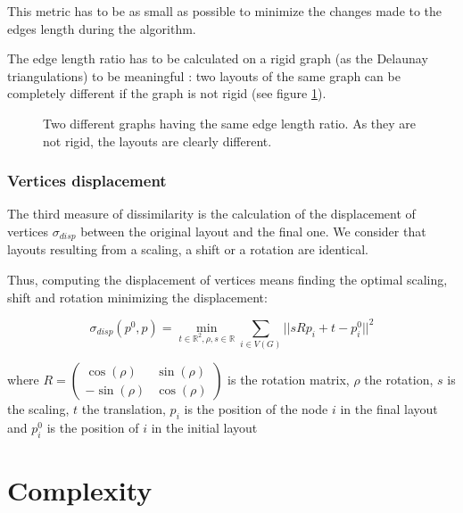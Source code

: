 \documentclass[12pt]{report}
\begin{document}
This metric has to be as small as possible to minimize the changes made to the edges length during the algorithm.

The edge length ratio has to be calculated on a rigid graph (as the Delaunay triangulations) to be meaningful : two layouts of the same graph can be completely different if the graph is not rigid (see figure \ref{rigidGraph}).

\begin{figure}[h]
	\center
  \setlength\fboxsep{5pt}
  \setlength\fboxrule{0.5pt}
  \caption{Two different graphs having the same edge length ratio. As they are not rigid, the layouts are clearly different.}
  \label{rigidGraph}
\end{figure}

\subsubsection{Vertices displacement}

The third measure of dissimilarity is the calculation of the displacement of vertices $\sigma_{disp}$ between the original layout and the final one. We consider that layouts resulting from a scaling, a shift or a rotation are identical. 

Thus, computing the displacement of vertices means finding the optimal scaling, shift and rotation minimizing the displacement:

\[\sigma_{disp}(p^0, p) = \min_{t \in \mathbb{R}^2, \rho, s \in \mathbb{R}} 
\sum_{i \in V(G)} || s R p_i + t - p_i^0||^2 \]

where $R = \begin{pmatrix} \cos(\rho) & \sin(\rho) \\ -\sin(\rho) & \cos(\rho) \end{pmatrix}$ is the rotation matrix, $\rho$ the rotation, $s$ is the scaling, $t$ the translation, $p_i$ is the position of the node $i$ in the final layout and $p_i^0$ is the position of $i$ in the initial layout

\section{Complexity}
\end{document}
